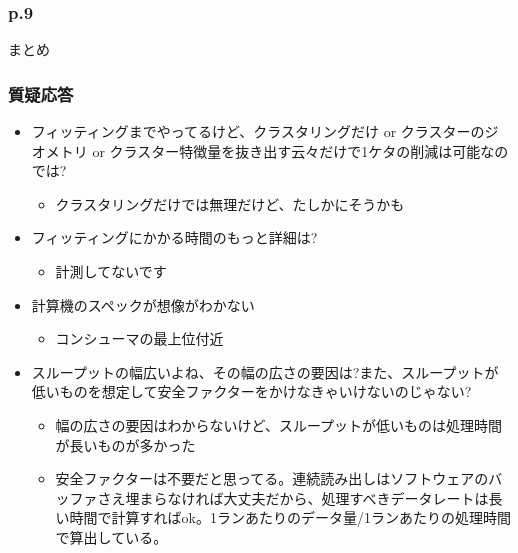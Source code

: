 \documentclass[12pt,a4paper,upLaTeX]{jsarticle}
\begin{document}
\subsubsection*{p.9}
まとめ

\subsubsection*{質疑応答}
\begin{itemize}
\item フィッティングまでやってるけど、クラスタリングだけ or クラスターのジオメトリ or クラスター特徴量を抜き出す云々だけで1ケタの削減は可能なのでは?
\begin{itemize}
\item クラスタリングだけでは無理だけど、たしかにそうかも
\end{itemize}
\item フィッティングにかかる時間のもっと詳細は?
\begin{itemize}
\item 計測してないです
\end{itemize}
\item 計算機のスペックが想像がわかない
\begin{itemize}
\item コンシューマの最上位付近
\end{itemize}
\item スループットの幅広いよね、その幅の広さの要因は?また、スループットが低いものを想定して安全ファクターをかけなきゃいけないのじゃない?
\begin{itemize}
\item 幅の広さの要因はわからないけど、スループットが低いものは処理時間が長いものが多かった
\item 安全ファクターは不要だと思ってる。連続読み出しはソフトウェアのバッファさえ埋まらなければ大丈夫だから、処理すべきデータレートは長い時間で計算すればok。1ランあたりのデータ量/1ランあたりの処理時間で算出している。
\end{itemize}
\end{itemize}
\end{document}
